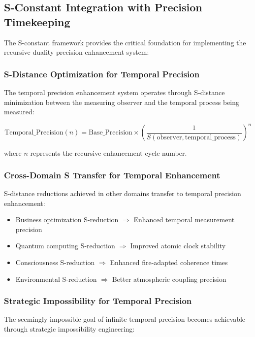 \documentclass[12pt,a4paper]{article}
\begin{document}
{\subsection{S-Constant Integration with Precision Timekeeping}

The S-constant framework provides the critical foundation for implementing the recursive duality precision enhancement system:

\subsubsection{S-Distance Optimization for Temporal Precision}

The temporal precision enhancement system operates through S-distance minimization between the measuring observer and the temporal process being measured:

\begin{equation}
\text{Temporal\_Precision}(n) = \text{Base\_Precision} \times \left(\frac{1}{S(\text{observer}, \text{temporal\_process})}\right)^n
\end{equation}

where $n$ represents the recursive enhancement cycle number.

\subsubsection{Cross-Domain S Transfer for Temporal Enhancement}

S-distance reductions achieved in other domains transfer to temporal precision enhancement:

\begin{itemize}
\item Business optimization S-reduction $\Rightarrow$ Enhanced temporal measurement precision
\item Quantum computing S-reduction $\Rightarrow$ Improved atomic clock stability
\item Consciousness S-reduction $\Rightarrow$ Enhanced fire-adapted coherence times
\item Environmental S-reduction $\Rightarrow$ Better atmospheric coupling precision
\end{itemize}

\subsubsection{Strategic Impossibility for Temporal Precision}

The seemingly impossible goal of infinite temporal precision becomes achievable through strategic impossibility engineering:

}
\end{document}
